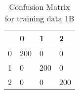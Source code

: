 

\begin{table}[]
    \centering
    
        \begin{tabular}{|l|l|l|l|}
        \hline
        &0&1&2\\
        \hline
        0&200&0&0\\
        \hline
        1&0&200&0\\
        \hline
        2&0&0&200\\
        \hline
        \end{tabular}

\caption{Confusion Matrix for training data 1B}
    \label{tab:conf_train1b}
\end{table}